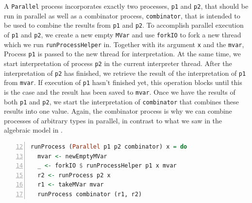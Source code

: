 A \texttt{Parallel} process incorporates exactly two processes, \texttt{p1} and \texttt{p2}, that should be run in parallel as well as a combinator process, \texttt{combinator}, that is intended to be used to combine the results from \texttt{p1} and \texttt{p2}. To accomplish parallel execution of \texttt{p1} and \texttt{p2}, we create a new empty \texttt{MVar} and use \texttt{forkIO} to fork a new thread which we run \texttt{runProcessHelper} in. Together with its argument \texttt{x} and the \texttt{mvar}, Process \texttt{p1} is passed to the new thread for interpretation. At the same time, we start interpretation of process \texttt{p2} in the current interpreter thread. After the interpretation of \texttt{p2} has finished, we retrieve the result of the interpretation of \texttt{p1} from \texttt{mvar}. If execution of \texttt{p1} hasn't finished yet, this operation blocks until this is the case and the result has been saved to \texttt{mvar}. Once we have the results of both \texttt{p1} and \texttt{p2}, we start the interpretation of \texttt{combinator} that combines these results into one value. Again, the combinator process is why we can combine processes of arbitrary types in parallel, in contrast to what we saw in the algebraic model in .
\begin{lstlisting}[language=Haskell,caption=Implementation of the interpreter for \texttt{Parallel} processes.,numbers=left,frame=bt,label=lst:local_runprocess_parallel,firstnumber=12]
runProcess (Parallel p1 p2 combinator) x = do
  mvar <- newEmptyMVar
  _ <- forkIO $ runProcessHelper p1 x mvar
  r2 <- runProcess p2 x
  r1 <- takeMVar mvar
  runProcess combinator (r1, r2)
\end{lstlisting}

